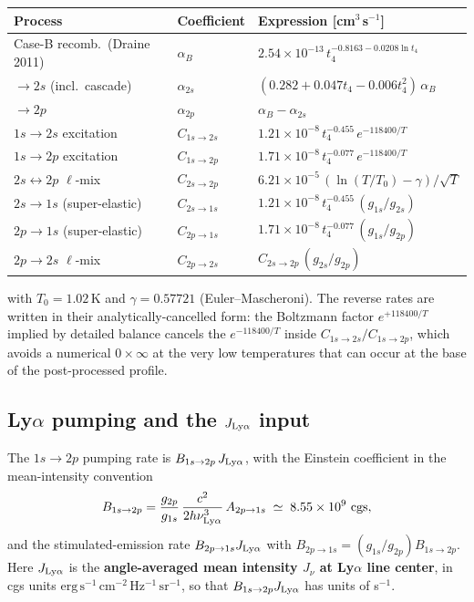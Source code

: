 \documentclass[english,a4paper]{kiseon_memo}
\begin{document}
\begin{center}
\small
\begin{tabular}{lll}
\toprule
Process & Coefficient & Expression [cm$^3$\,s$^{-1}$] \\
\midrule
Case-B recomb.\ (Draine 2011)   & $\alpha_B$        & $2.54\times10^{-13}\,t_4^{-0.8163-0.0208\ln t_4}$ \\
$\to 2s$ (incl.\ cascade)        & $\alpha_{2s}$     & $(0.282+0.047t_4-0.006t_4^2)\,\alpha_B$ \\
$\to 2p$                         & $\alpha_{2p}$     & $\alpha_B-\alpha_{2s}$ \\
$1s\to2s$ excitation             & $C_{1s\to2s}$     & $1.21\times10^{-8}\,t_4^{-0.455}\,e^{-118400/T}$ \\
$1s\to2p$ excitation             & $C_{1s\to2p}$     & $1.71\times10^{-8}\,t_4^{-0.077}\,e^{-118400/T}$ \\
$2s\leftrightarrow2p$ $\ell$-mix & $C_{2s\to2p}$     & $6.21\times10^{-5}\,(\ln(T/T_0)-\gamma)/\sqrt{T}$ \\
$2s\to1s$ (super-elastic)        & $C_{2s\to1s}$     & $1.21\times10^{-8}\,t_4^{-0.455}\,(g_{1s}/g_{2s})$ \\
$2p\to1s$ (super-elastic)        & $C_{2p\to1s}$     & $1.71\times10^{-8}\,t_4^{-0.077}\,(g_{1s}/g_{2p})$ \\
$2p\to2s$ $\ell$-mix             & $C_{2p\to2s}$     & $C_{2s\to2p}\,(g_{2s}/g_{2p})$ \\
\bottomrule
\end{tabular}
\end{center}
with $T_0=1.02\,$K and $\gamma=0.57721$ (Euler--Mascheroni). The reverse
rates are written in their analytically-cancelled form: the Boltzmann
factor $e^{+118400/T}$ implied by detailed balance cancels the
$e^{-118400/T}$ inside $C_{1s\to2s}/C_{1s\to2p}$, which avoids a
numerical $0\times\infty$ at the very low temperatures that can occur at
the base of the post-processed profile.

\subsection{Ly$\alpha$ pumping and the $J_{\rm Ly\alpha}$ input}
\label{sec:jlya}

The $1s\to2p$ pumping rate is $B_{1s\to2p}\,J_{\rm Ly\alpha}$, with the
Einstein coefficient in the mean-intensity convention
\[
  B_{1s\to2p} = \frac{g_{2p}}{g_{1s}}\,\frac{c^2}{2h\nu_{\rm Ly\alpha}^3}\,
                A_{2p\to1s} \;\simeq\; 8.55\times10^{9}\ \mathrm{cgs},
\]
and the stimulated-emission rate $B_{2p\to1s}J_{\rm Ly\alpha}$ with
$B_{2p\to1s}=(g_{1s}/g_{2p})B_{1s\to2p}$. Here $J_{\rm Ly\alpha}$ is the
\textbf{angle-averaged mean intensity $J_\nu$ at Ly$\alpha$ line center},
in cgs units $\mathrm{erg\,s^{-1}\,cm^{-2}\,Hz^{-1}\,sr^{-1}}$, so that
$B_{1s\to2p}J_{\rm Ly\alpha}$ has units of s$^{-1}$.
\end{document}
